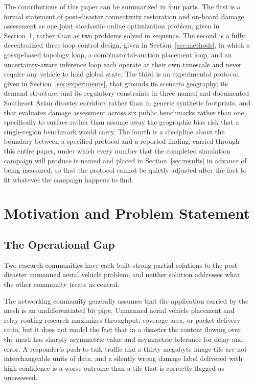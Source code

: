 \documentclass[drones,article,submit,moreauthors]{Definitions/mdpi}
\begin{document}
The contributions of this paper can be summarized in four parts. The first is a formal statement of post-disaster connectivity restoration and on-board damage assessment as one joint stochastic online optimization problem, given in Section~\ref{sec:motivation}, rather than as two problems solved in sequence. The second is a fully decentralized three-loop control design, given in Section~\ref{sec:methods}, in which a gossip-based topology loop, a combinatorial-auction placement loop, and an uncertainty-aware inference loop each operate at their own timescale and never require any vehicle to hold global state. The third is an experimental protocol, given in Section~\ref{sec:experiments}, that grounds its scenario geography, its demand structure, and its regulatory constraints in three named and documented Southeast Asian disaster corridors rather than in generic synthetic footprints, and that evaluates damage assessment across six public benchmarks rather than one, specifically to surface rather than assume away the geographic bias risk that a single-region benchmark would carry. The fourth is a discipline about the boundary between a specified protocol and a reported finding, carried through this entire paper, under which every number that the completed simulation campaign will produce is named and placed in Section~\ref{sec:results} in advance of being measured, so that the protocol cannot be quietly adjusted after the fact to fit whatever the campaign happens to find.

\section{Motivation and Problem Statement}
\label{sec:motivation}

\subsection{The Operational Gap}

Two research communities have each built strong partial solutions to the post-disaster unmanned aerial vehicle problem, and neither solution addresses what the other community treats as central.

The networking community generally assumes that the application carried by the mesh is an undifferentiated bit pipe. Unmanned aerial vehicle placement and relay-routing research \cite{mozaffari2016efficient,chiaraviglio2019optimal,hayat2016survey} maximizes throughput, coverage area, or packet delivery ratio, but it does not model the fact that in a disaster the content flowing over the mesh has sharply asymmetric value and asymmetric tolerance for delay and error. A responder's push-to-talk traffic and a thirty megabyte image tile are not interchangeable units of data, and a silently wrong damage label delivered with high confidence is a worse outcome than a tile that is correctly flagged as unassessed.
\end{document}
